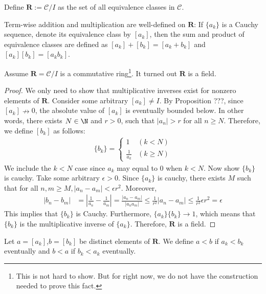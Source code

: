\documentclass[10pt]{article}
\begin{document}
\begin{definition}
    Define $\textbf{R}:=\mathcal{C}/I$ as the set of all equivalence classes in $\mathcal{C}$.
\end{definition}
\begin{proposition}
    Term-wise addition and multiplication are well-defined on $\textbf{R}$: If $\{a_k\}$ is a Cauchy sequence, denote its equivalence class by $[a_k]$, then the sum and product of equivalence classes are defined as $[a_k] + [b_k] = [a_k + b_k]$ and $[a_k][b_k] = [a_kb_k]$.
\end{proposition}
\begin{proposition}
    Assume $\mathbf{R} = \mathcal{C}/I$ is a commutative ring\footnote{This is not hard to show. But for right now, we do not have the construction needed to prove this fact.}. It turned out $\mathbf{R}$ is a field.
\end{proposition}
\begin{proof}
    We only need to show that multiplicative inverses exist for nonzero elements of $\mathbf{R}$. Consider some arbitrary $[a_k] \neq I$. By Proposition ???, since $[a_k]\nrightarrow 0$, the absolute value of $[a_k]$ is eventually bounded below. In other words, there exists $N\in\N$ and $r > 0$, such that $|a_n| > r$ for all $n \geq N$. Therefore, we define $[b_k]$ as follows:
    \begin{align*}
        \{b_k\}=
        \begin{cases}
            1                   &(k < N)\\
            \frac{1}{a_k}       &(k \geq N)
        \end{cases}
    \end{align*}
    We include the $k < N$ case since $a_k$ may equal to $0$ when $k < N$. Now show $\{b_k\}$ is cauchy. Take some arbitrary $\epsilon>0$. Since $\{a_k\}$ is cauchy, there exists $M$ such that for all $n,m\geq M,|a_n-a_m|<\epsilon r^2$. Moreover,
    \begin{align*}
        |b_n-b_m|&=|\frac{1}{a_n} - \frac{1}{a_m}|=\frac{|a_n - a_m|}{|a_na_m|} \leq\frac{1}{r^2}|a_n - a_m|\leq\frac{1}{r^2}\epsilon r^2=\epsilon
    \end{align*}
    This implies that $\{b_k\}$ is Cauchy. Furthermore, $\{a_k\}\{b_k\}\rightarrow 1$, which means that $\{b_k\}$ is the multiplicative inverse of $\{a_k\}$. Therefore, $\mathbf{R}$ is a field.
\end{proof}
\begin{definition}
    Let $a=[a_k]$,$b=[b_k]$ be distinct elements of $\textbf{R}$. We define $a<b$ if $a_k <b_k$ eventually and $b<a$ if $b_k <a_k$ eventually.
\end{definition}
\end{document}

